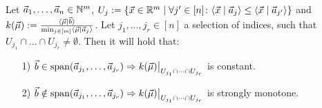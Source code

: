 \begin{lemma}
    Let $\vec a_1, \dots, \vec a_n \in \mathbb{N}^m$, $U_j := \{\vec x \in \mathbb{R}^m \mid \forall j' \in [n]\colon \langle \vec x \mid \vec a_j \rangle \leq \langle \vec x \mid \vec a_{j'} \rangle\}$ and $k(\vec \mu) := \frac{\langle \vec{\mu} \mid \vec b \rangle}{\min_{j \in [m]} \langle \vec \mu \mid \vec a_j \rangle}$. Let $j_1, \dots, j_r \in [n]$ a selection of indices, such that $U_{j_1} \cap \dots \cap U_{j_r} \neq \emptyset$.  Then it will hold that:
    \begin{itemize}
        \item[1)] $\vec b \in \Span(\vec a_{j_1}, \dots, \vec a_{j_r}) \Rightarrow \restrict{k(\vec \mu)}{U_{j_1} \cap \dots \cap U_{j_r}}$ is constant.
        \item[2)] $\vec b \notin \Span(\vec a_{j_1}, \dots, \vec a_{j_r}) \Rightarrow \restrict{k(\vec \mu)}{U_{j_1} \cap \dots \cap U_{j_r}}$ is strongly monotone.
    \end{itemize}
\end{lemma}
